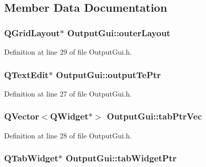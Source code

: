 \subsection{Member Data Documentation}
\hypertarget{class_output_gui_aa25ed1be530acc4508eaf042144b4458}{
\subsubsection[{outer\-Layout}]{\setlength{\rightskip}{0pt plus 5cm}Q\-Grid\-Layout$\ast$ Output\-Gui\-::outer\-Layout\hspace{0.3cm}{\ttfamily [private]}}}\label{class_output_gui_aa25ed1be530acc4508eaf042144b4458}


Definition at line 29 of file Output\-Gui.\-h.

\hypertarget{class_output_gui_affbe7d587f4f755b67cae654f5e468d8}{
\subsubsection[{output\-Te\-Ptr}]{\setlength{\rightskip}{0pt plus 5cm}Q\-Text\-Edit$\ast$ Output\-Gui\-::output\-Te\-Ptr\hspace{0.3cm}{\ttfamily [private]}}}\label{class_output_gui_affbe7d587f4f755b67cae654f5e468d8}


Definition at line 27 of file Output\-Gui.\-h.

\hypertarget{class_output_gui_a669643ee3eabbe9b198bcb43f56ae053}{
\subsubsection[{tab\-Ptr\-Vec}]{\setlength{\rightskip}{0pt plus 5cm}Q\-Vector$<$Q\-Widget$\ast$$>$ Output\-Gui\-::tab\-Ptr\-Vec\hspace{0.3cm}{\ttfamily [private]}}}\label{class_output_gui_a669643ee3eabbe9b198bcb43f56ae053}


Definition at line 28 of file Output\-Gui.\-h.

\hypertarget{class_output_gui_a2f8f77a6c77ee8bb00088be2de61c93b}{
\subsubsection[{tab\-Widget\-Ptr}]{\setlength{\rightskip}{0pt plus 5cm}Q\-Tab\-Widget$\ast$ Output\-Gui\-::tab\-Widget\-Ptr\hspace{0.3cm}{\ttfamily [private]}}}\label{class_output_gui_a2f8f77a6c77ee8bb00088be2de61c93b}


